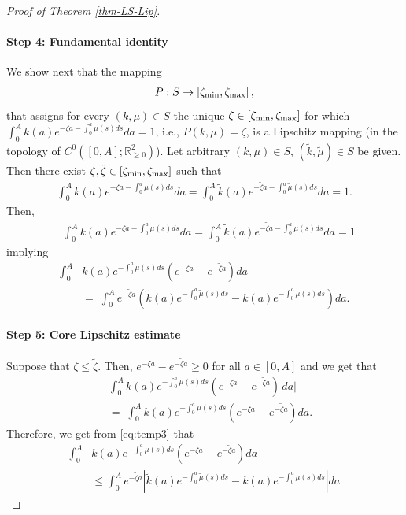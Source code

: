 \documentclass[journal,twoside,web]{ieeecolor}
\begin{document}
\begin{proof}[Proof of Theorem \ref{thm-LS-Lip}]
\paragraph*{Step 4: Fundamental identity}
We show next that the mapping
\begin{align}
P : S \to [\zeta_{\rm min},\zeta_{\rm max}]\,, 
\end{align}
that assigns for every $(k,\mu)\in S$ the unique $\zeta\in [\zeta_{\rm min},\zeta_{\rm max}]$ for which $\int_0^A k(a) e^{-\zeta a - \int_0^a \mu(s)ds}da = 1$, i.e., $P(k,\mu)=\zeta$,
is a Lipschitz mapping (in the topology of $C^0([0,A];\mathbb{R}_{\geq 0}^2)$).
Let arbitrary $(k,\mu)\in S$, $(\tilde{k},\tilde{\mu})\in S$ be given. 
Then there exist $\zeta,\tilde{\zeta}\in [\zeta_{\rm min},\zeta_{\rm max}]$ such that
\begin{align}
\int_0^A k(a) e^{-\zeta a - \int_0^a \mu(s) ds} da = \int_0^A \tilde{k}(a)e^{-\tilde{\zeta}a - \int_0^a \tilde{\mu}(s) ds} da = 1.
\end{align}
Then,
\begin{align}
&\int_0^A k(a) e^{-\zeta a - \int_0^a \mu(s)ds} da = \int_0^A \tilde{k}(a) e^{-\tilde{\zeta}a - \int_0^a \tilde{\mu}(s)ds }da = 1
\end{align}
implying
\begin{align} \int_0^A &k(a) e^{-\int_0^a \mu(s)ds} \left( e^{-\zeta a}-e^{-\tilde{\zeta}a} \right)da 
\\ &=\;  \int_0^A e^{-\tilde{\zeta}a} \left(\tilde{k}(a) e^{-\int_0^a \tilde{\mu}(s)ds}
- k(a) e^{-\int_0^a \mu(s)ds} \right) da.\label{eq:temp3} 
\end{align}

\paragraph*{Step 5: Core Lipschitz estimate}
Suppose that $\zeta \le \tilde{\zeta}$. Then, $e^{-\zeta a}- e^{-\tilde{\zeta}a} \ge 0$ for all $a\in[0,A]$ and we get that
\begin{align}
\nonumber \bigg|&\int_0^A k(a) e^{-\int_0^a \mu(s)ds} \left(e^{-\zeta a} - e^{-\tilde{\zeta}a}\right)\, da\bigg|
\\ &=\;  \int_0^A k(a)e^{-\int_0^a \mu(s)ds} \left( e^{-\zeta a}- e^{-\tilde{\zeta}a} \right) da.
\end{align}
Therefore, we get from \eqref{eq:temp3} that
\begin{align}
   \nonumber \int_0^A &k(a)e^{-\int_0^a \mu(s)ds} \left( e^{-\zeta a}- e^{-\tilde{\zeta}a} \right) da 
   \\ &\leq \int_0^A  e^{-\tilde{\zeta}a} \left| \tilde{k}(a) e^{-\int_0^a \tilde{\mu}(s) ds} - k(a) e^{-\int_0^a \mu(s) ds} \right| da 
\end{align}


\end{proof}
\end{document}
